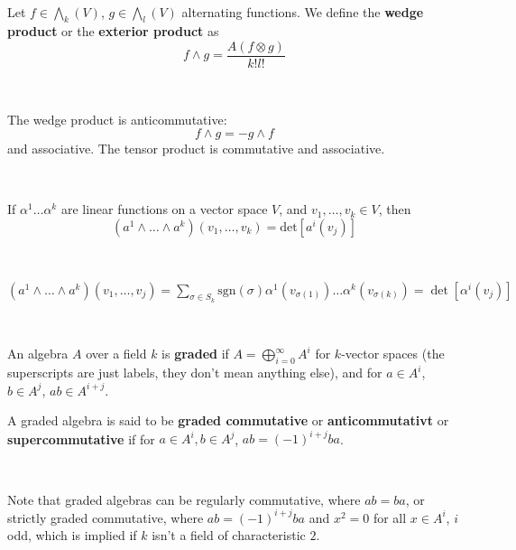 \documentclass{article}
\begin{document}
\begin{definition}
  \

  Let $f \in \bigwedge_k(V)$, $g \in \bigwedge_l(V)$ alternating functions. We define the \textbf{wedge product} or the \textbf{exterior product} as $$f \wedge g = \frac{A(f \otimes g)}{k!l!}$$
\end{definition}

\begin{proposition}
  \

  The wedge product is anticommutative: $$f \wedge g = - g\wedge f$$and associative. The tensor product is commutative and associative.
\end{proposition}

\begin{proposition}
  \

  If $\alpha^1\dots \alpha^k$ are linear functions on a vector space $V$, and $v_1, \dots,v_k \in V$, then $$(a^1 \wedge \dots \wedge a^k)(v_1, \dots, v_k) = \text{det}[a^i(v_j)]$$
\end{proposition}

\begin{customproof}
  \

  $(a^1 \wedge \dots \wedge a^k)(v_1,\dots, v_j) = \sum_{\sigma \in S_k} \text{sgn}(\sigma) \alpha^1(v_{\sigma(1)}) \dots \alpha^k(v_{\sigma(k)}) = \det[\alpha^i(v_j)]$
\end{customproof}

\begin{definition}
  \

  An algebra $A$ over a field $k$ is \textbf{graded} if $A = \bigoplus_{i=0}^\infty A^i$ for $k$-vector spaces (the superscripts are just labels, they don't mean anything else), and for $a \in A^i$, $b \in A^j$, $ab \in A^{i+j}$.

  A graded algebra is said to be \textbf{graded commutative} or \textbf{anticommutativt} or \textbf{supercommutative} if for $a \in A^i, b \in A^j$, $ab = (-1)^{i+j}ba$.
\end{definition}

\begin{remark}
  \

  Note that graded algebras can be regularly commutative, where $ab = ba$, or strictly graded commutative, where $ab = (-1)^{i+j}ba$ and $x^2 = 0$ for all $x \in A^i$, $i$ odd, which is implied if $k$ isn't a field of characteristic $2$.
\end{remark}
\end{document}
